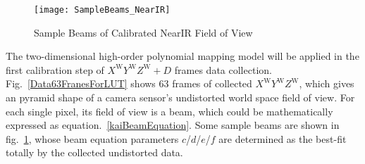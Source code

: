 %
%
\begin{figure}[t]
\centering
\texttt{[image: SampleBeams\_NearIR]}
\caption{Sample Beams of Calibrated NearIR Field of View}
\label{SampleBeams_NearIR}
\end{figure}
%
The two-dimensional high-order polynomial mapping model will be applied in the first calibration step of \(X^\text{W}Y^\text{W}Z^\text{W}+D\) frames data collection. Fig.~\ref{Data63FranesForLUT} shows 63 frames of collected \(X^\text{W}Y^\text{W}Z^\text{W}\), which gives an pyramid shape of a camera sensor's undistorted world space field of view. For each single pixel, its field of view is a beam, which could be mathematically expressed as equation.~\ref{kaiBeamEquation}. Some sample beams are shown in fig.~\ref{SampleBeams_NearIR}, whose beam equation parameters \(c\)/\(d\)/\(e\)/\(f\) are determined as the best-fit totally by the collected undistorted data. 


